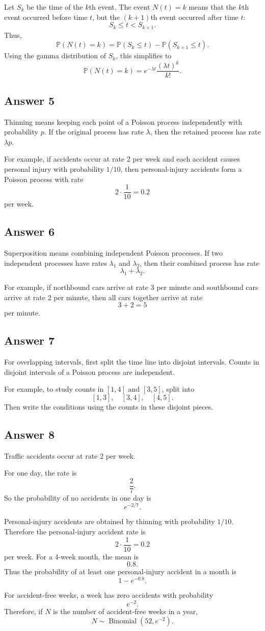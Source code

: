 \documentclass[12pt,a4paper]{article}
\theoremstyle{lecturestyle}
\newcommand{\Prob}{\mathbb{P}}
\begin{document}
Let $S_k$ be the time of the $k$th event. The event $N(t)=k$ means that the $k$th event occurred before time $t$, but the $(k+1)$th event occurred after time $t$:
\[
S_k\leq t<S_{k+1}.
\]
Thus,
\[
\Prob(N(t)=k)=\Prob(S_k\leq t)-\Prob(S_{k+1}\leq t).
\]
Using the gamma distribution of $S_k$, this simplifies to
\[
\Prob(N(t)=k)=e^{-\lambda t}\frac{(\lambda t)^k}{k!}.
\]

\subsection*{Answer 5}

Thinning means keeping each point of a Poisson process independently with probability $p$. If the original process has rate $\lambda$, then the retained process has rate $\lambda p$.

For example, if accidents occur at rate 2 per week and each accident causes personal injury with probability $1/10$, then personal-injury accidents form a Poisson process with rate
\[
2\cdot\frac1{10}=0.2
\]
per week.

\subsection*{Answer 6}

Superposition means combining independent Poisson processes. If two independent processes have rates $\lambda_1$ and $\lambda_2$, then their combined process has rate
\[
\lambda_1+\lambda_2.
\]

For example, if northbound cars arrive at rate 3 per minute and southbound cars arrive at rate 2 per minute, then all cars together arrive at rate
\[
3+2=5
\]
per minute.

\subsection*{Answer 7}

For overlapping intervals, first split the time line into disjoint intervals. Counts in disjoint intervals of a Poisson process are independent.

For example, to study counts in $[1,4]$ and $[3,5]$, split into
\[
[1,3],\quad [3,4],\quad [4,5].
\]
Then write the conditions using the counts in these disjoint pieces.

\subsection*{Answer 8}

Traffic accidents occur at rate 2 per week.

For one day, the rate is
\[
\frac27.
\]
So the probability of no accidents in one day is
\[
e^{-2/7}.
\]

Personal-injury accidents are obtained by thinning with probability $1/10$. Therefore the personal-injury accident rate is
\[
2\cdot\frac1{10}=0.2
\]
per week. For a 4-week month, the mean is
\[
0.8.
\]
Thus the probability of at least one personal-injury accident in a month is
\[
1-e^{-0.8}.
\]

For accident-free weeks, a week has zero accidents with probability
\[
e^{-2}.
\]
Therefore, if $N$ is the number of accident-free weeks in a year,
\[
N\sim \operatorname{Binomial}(52,e^{-2}).
\]
\end{document}
